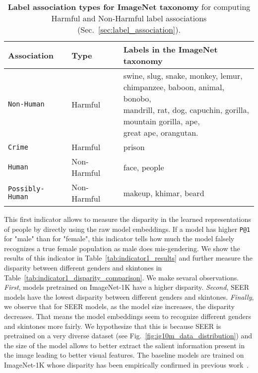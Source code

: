 \documentclass[10pt,twocolumn,letterpaper]{article}
\newcommand{\ImNetDataset}{ImageNet\xspace}
\newcommand{\ImNet}{ImageNet-1K\xspace}
\begin{document}
\begin{table}[t]
  \centering
  \begin{adjustbox}{max width=\linewidth}
    \begin{tabular}{@{}lll@{}}
      \toprule
      \textbf{Association} & \textbf{Type} & \textbf{Labels in the \ImNetDataset taxonomy} \\
      
      \midrule
      \texttt{Non-Human} & Harmful & \makecell[l]{swine, slug, snake, monkey, lemur, \\
      chimpanzee, baboon, animal, bonobo, \\
      mandrill, rat, dog, capuchin, gorilla, \\
      mountain gorilla, ape, \\
      great ape, orangutan.} \\
      \midrule
      \texttt{Crime} & Harmful & prison \\
      \midrule
      \texttt{Human} & Non-Harmful & face, people\\
      \midrule
      \texttt{Possibly-Human} & Non-Harmful & makeup, khimar, beard \\
      \bottomrule
    \end{tabular}
    
  \end{adjustbox}
  \caption{
    \textbf{Label association types for ImageNet taxonomy} for computing Harmful and Non-Harmful label associations (Sec.~\ref{sec:label_association}).
  }
  \label{tab:label_association}
\end{table}


This first indicator allows to measure the disparity in the learned representations of people by directly using the raw model embeddings.
If a model has higher \texttt{P@1} for "male" than for "female", this indicator tells how much the model falsely recognizes a true female population as male \ie does mis-gendering. 
We show the results of this indicator in Table~\ref{tab:indicator1_results} and further measure the disparity between different genders and skintones in Table~\ref{tab:indicator1_disparity_comparison}. 
We make sevaral observations.
\textit{First}, models pretrained on \ImNet have a higher disparity.
\textit{Second}, SEER models have the lowest disparity between different genders and skintones.
\textit{Finally}, we observe that for SEER models, as the model size increases, the disparity decreases.
That means the model embeddings seem to recognize different genders and skintones more fairly.
We hypothesize that this is because SEER is pretrained on a very diverse dataset (see Fig.~\ref{fig:ig10m_data_distribution}) and the size of the model allows to better extract the salient information present in the image leading to better visual features.
The baseline models are trained on \ImNet whose disparity has been empirically confirmed in previous work~\cite{yang2020towards}. 
\end{document}
